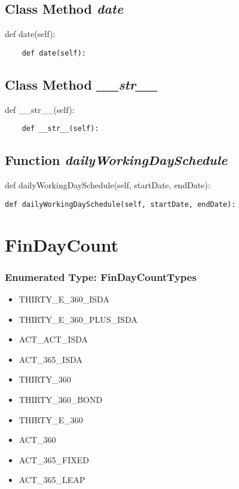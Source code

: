 \documentclass[twoside,11pt]{book}
\begin{document}
\subsection{Class Method {\it date}}
def date(self):

\begin{lstlisting}
    def date(self):
\end{lstlisting}

\subsection{Class Method {\it \_\_str\_\_}}
def \_\_str\_\_(self):

\begin{lstlisting}
    def __str__(self):
\end{lstlisting}

\subsection{Function {\it dailyWorkingDaySchedule}}
def dailyWorkingDaySchedule(self, startDate, endDate):

\begin{lstlisting}
def dailyWorkingDaySchedule(self, startDate, endDate):
\end{lstlisting}

\newpage
\section{FinDayCount}

\subsubsection{Enumerated Type: FinDayCountTypes}
\begin{itemize}
\item{THIRTY\_E\_360\_ISDA}
\item{THIRTY\_E\_360\_PLUS\_ISDA}
\item{ACT\_ACT\_ISDA}
\item{ACT\_365\_ISDA}
\item{THIRTY\_360}
\item{THIRTY\_360\_BOND}
\item{THIRTY\_E\_360}
\item{ACT\_360}
\item{ACT\_365\_FIXED}
\item{ACT\_365\_LEAP}
\end{itemize}
\end{document}
